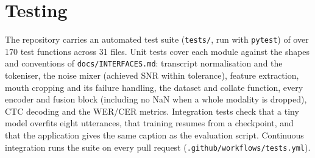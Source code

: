 \section{Testing}
\label{sec:testing}
The repository carries an automated test suite (\texttt{tests/}, run with \texttt{pytest}) of
over 170 test functions across 31 files. Unit tests cover each module against the shapes and
conventions of \texttt{docs/\allowbreak{}INTERFACES.md}: transcript normalisation and the tokeniser, the
noise mixer (achieved SNR within tolerance), feature extraction, mouth cropping and its failure
handling, the dataset and collate function, every encoder and fusion block (including no NaN
when a whole modality is dropped), CTC decoding and the WER/CER metrics. Integration tests check
that a tiny model overfits eight utterances, that training resumes from a checkpoint, and that
the application gives the same caption as the evaluation script. Continuous integration runs
the suite on every pull request (\texttt{.github/\allowbreak{}workflows/\allowbreak{}tests.yml}).
